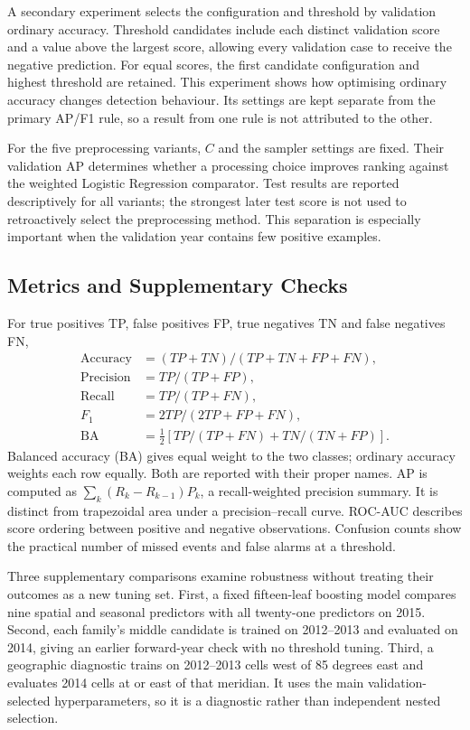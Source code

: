 \documentclass[conference,a4paper]{IEEEtran}
\begin{document}
A secondary experiment selects the configuration and threshold by validation ordinary accuracy. Threshold candidates include each distinct validation score and a value above the largest score, allowing every validation case to receive the negative prediction. For equal scores, the first candidate configuration and highest threshold are retained. This experiment shows how optimising ordinary accuracy changes detection behaviour. Its settings are kept separate from the primary AP/F1 rule, so a result from one rule is not attributed to the other.

For the five preprocessing variants, $C$ and the sampler settings are fixed. Their validation AP determines whether a processing choice improves ranking against the weighted Logistic Regression comparator. Test results are reported descriptively for all variants; the strongest later test score is not used to retroactively select the preprocessing method. This separation is especially important when the validation year contains few positive examples.

\subsection{Metrics and Supplementary Checks}
For true positives TP, false positives FP, true negatives TN and false negatives FN,
\begin{align}
\mathrm{Accuracy}&=(TP+TN)/(TP+TN+FP+FN),\\
\mathrm{Precision}&=TP/(TP+FP),\\
\mathrm{Recall}&=TP/(TP+FN),\\
F_1&=2TP/(2TP+FP+FN),\\
\mathrm{BA}&=\tfrac12[TP/(TP+FN)+TN/(TN+FP)].
\end{align}
Balanced accuracy (BA) gives equal weight to the two classes; ordinary accuracy weights each row equally. Both are reported with their proper names. AP is computed as $\sum_k(R_k-R_{k-1})P_k$, a recall-weighted precision summary. It is distinct from trapezoidal area under a precision--recall curve. ROC-AUC describes score ordering between positive and negative observations. Confusion counts show the practical number of missed events and false alarms at a threshold.

Three supplementary comparisons examine robustness without treating their outcomes as a new tuning set. First, a fixed fifteen-leaf boosting model compares nine spatial and seasonal predictors with all twenty-one predictors on 2015. Second, each family's middle candidate is trained on 2012--2013 and evaluated on 2014, giving an earlier forward-year check with no threshold tuning. Third, a geographic diagnostic trains on 2012--2013 cells west of 85 degrees east and evaluates 2014 cells at or east of that meridian. It uses the main validation-selected hyperparameters, so it is a diagnostic rather than independent nested selection.
\end{document}
